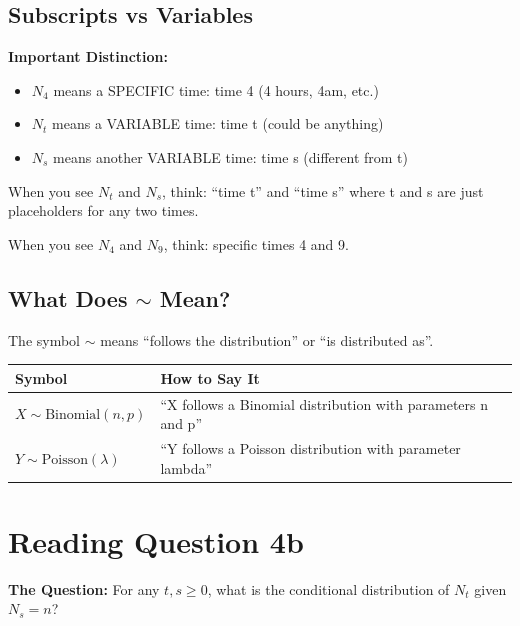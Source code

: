 \documentclass[11pt]{article}
\begin{document}
\subsection{Subscripts vs Variables}

\begin{tcolorbox}[colback=yellow!10!white,colframe=orange!75!black]
\textbf{Important Distinction:}

\begin{itemize}
    \item $N_4$ means a SPECIFIC time: time 4 (4 hours, 4am, etc.)
    \item $N_t$ means a VARIABLE time: time t (could be anything)
    \item $N_s$ means another VARIABLE time: time s (different from t)
\end{itemize}

When you see $N_t$ and $N_s$, think: ``time t'' and ``time s'' where t and s are just placeholders for any two times.

When you see $N_4$ and $N_9$, think: specific times 4 and 9.
\end{tcolorbox}

\subsection{What Does $\sim$ Mean?}

The symbol $\sim$ means ``follows the distribution'' or ``is distributed as''.

\begin{table}[h]
\centering
\begin{tabular}{|l|l|}
\hline
\textbf{Symbol} & \textbf{How to Say It} \\
\hline
$X \sim \text{Binomial}(n, p)$ & ``X follows a Binomial distribution with parameters n and p'' \\
\hline
$Y \sim \text{Poisson}(\lambda)$ & ``Y follows a Poisson distribution with parameter lambda'' \\
\hline
\end{tabular}
\end{table}

\section{Reading Question 4b}

\textbf{The Question:} For any $t, s \geq 0$, what is the conditional distribution of $N_t$ given $N_s = n$?
\end{document}
